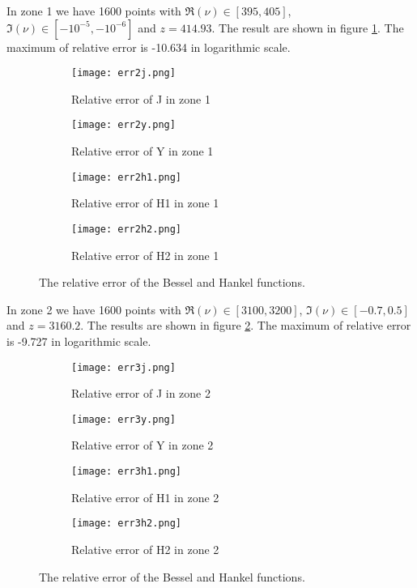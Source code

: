 \documentclass[12pt,a4paper]{article}
\numberwithin{equation}{section}
\theoremstyle{definition}
\theoremstyle{plain}
\theoremstyle{remark}
\begin{document}
\bigskip

In zone 1 we have 1600 points with \( \Re(\nu) \in [395,405] \), \( \Im(\nu) \in [-10^{-5},-10^{-6}] \) and \( z = 414.93 \).
The result are shown in figure \ref{err2}.
The maximum of relative error is -10.634 in logarithmic scale.
\begin{figure}[ht]
    \centering
    \begin{subfigure}[h]{0.45\textwidth}
        \texttt{[image: err2j.png]}
        \caption{Relative error of J in zone 1}
    \end{subfigure}
    \begin{subfigure}[h]{0.45\textwidth}
        \texttt{[image: err2y.png]}
        \caption{Relative error of Y in zone 1}
    \end{subfigure}

    \begin{subfigure}[h]{0.45\textwidth}
        \texttt{[image: err2h1.png]}
        \caption{Relative error of H1 in zone 1}
    \end{subfigure}
    \begin{subfigure}[h]{0.45\textwidth}
        \texttt{[image: err2h2.png]}
        \caption{Relative error of H2 in zone 1}
    \end{subfigure}
    \caption{The relative error of the Bessel and Hankel functions.}
    \label{err2}
\end{figure}

\bigskip

In zone 2 we have 1600 points with \( \Re(\nu) \in [3100,3200] \), \( \Im(\nu) \in [-0.7,0.5] \) and \( z = 3160.2 \).
The results are shown in figure \ref{err3}.
The maximum of relative error is -9.727 in logarithmic scale.
\begin{figure}[ht]
    \centering
    \begin{subfigure}[h]{0.45\textwidth}
        \texttt{[image: err3j.png]}
        \caption{Relative error of J in zone 2}
    \end{subfigure}
    \begin{subfigure}[h]{0.45\textwidth}
        \texttt{[image: err3y.png]}
        \caption{Relative error of Y in zone 2}
    \end{subfigure}

    \begin{subfigure}[h]{0.45\textwidth}
        \texttt{[image: err3h1.png]}
        \caption{Relative error of H1 in zone 2}
    \end{subfigure}
    \begin{subfigure}[h]{0.45\textwidth}
        \texttt{[image: err3h2.png]}
        \caption{Relative error of H2 in zone 2}
    \end{subfigure}
    \caption{The relative error of the Bessel and Hankel functions.}
    \label{err3}
\end{figure}
\end{document}
